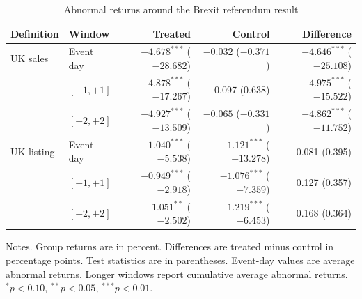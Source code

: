 \begin{table}[H]
  \centering
  \singlespacing
  \caption{Abnormal returns around the Brexit referendum result}
  \label{tab:event_returns}
  \begin{tabular}{@{}llrrr@{}}
    \toprule
    Definition & Window & Treated & Control & Difference \\
    \midrule
    UK sales & Event day & $-4.678^{***}$ ($-28.682$) & $-0.032$ ($-0.371$) & $-4.646^{***}$ ($-25.108$) \\
     & $[-1,+1]$ & $-4.878^{***}$ ($-17.267$) & 0.097 (0.638) & $-4.975^{***}$ ($-15.522$) \\
     & $[-2,+2]$ & $-4.927^{***}$ ($-13.509$) & $-0.065$ ($-0.331$) & $-4.862^{***}$ ($-11.752$) \\
    \midrule
    UK listing & Event day & $-1.040^{***}$ ($-5.538$) & $-1.121^{***}$ ($-13.278$) & 0.081 (0.395) \\
     & $[-1,+1]$ & $-0.949^{***}$ ($-2.918$) & $-1.076^{***}$ ($-7.359$) & 0.127 (0.357) \\
     & $[-2,+2]$ & $-1.051^{**}$ ($-2.502$) & $-1.219^{***}$ ($-6.453$) & 0.168 (0.364) \\
    \bottomrule
  \end{tabular}

  \medskip
  \begin{minipage}{\textwidth}
    Notes. Group returns are in percent. Differences are treated minus control in percentage points. Test statistics are in parentheses. Event-day values are average abnormal returns. Longer windows report cumulative average abnormal returns. $^{*}p<0.10$, $^{**}p<0.05$, $^{***}p<0.01$.
  \end{minipage}
\end{table}
